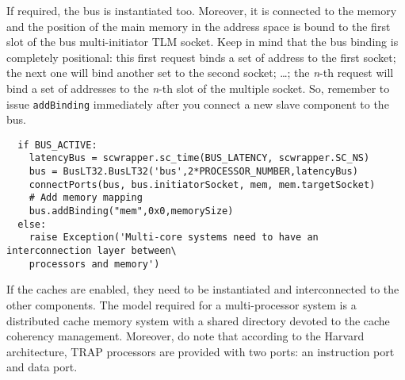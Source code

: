 \indent If required, the bus is instantiated too. Moreover, it is connected to the memory and the position of the main memory in the address space is bound to the first slot of the bus multi-initiator TLM socket. Keep in mind that the bus binding is completely positional: this first request binds a set of address to the first socket; the next one will bind another set to the second socket; \ldots; the \emph{n}-th request will bind a set of addresses to the \emph{n}-th slot of the multiple socket. So, remember to issue \texttt{addBinding} immediately after you connect a new slave component to the bus.

\scriptsize
\begin{verbatim}
  if BUS_ACTIVE:
    latencyBus = scwrapper.sc_time(BUS_LATENCY, scwrapper.SC_NS)
    bus = BusLT32.BusLT32('bus',2*PROCESSOR_NUMBER,latencyBus)
    connectPorts(bus, bus.initiatorSocket, mem, mem.targetSocket)
    # Add memory mapping
    bus.addBinding("mem",0x0,memorySize)
  else:
    raise Exception('Multi-core systems need to have an interconnection layer between\
    processors and memory')
\end{verbatim}
\normalsize

\indent If the caches are enabled, they need to be instantiated and interconnected to the other components. The model required for a multi-processor system is a distributed cache memory system with a shared directory devoted to the cache coherency management. Moreover, do note that according to the Harvard architecture, TRAP processors are provided with two ports: an instruction port and data port.


